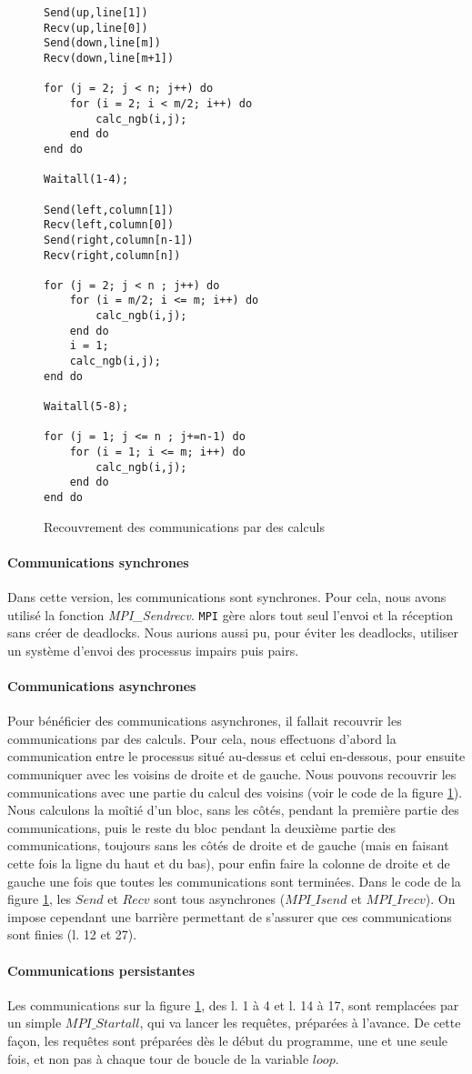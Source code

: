 \begin{figure}[h!]
\begin{lstlisting}
Send(up,line[1])
Recv(up,line[0])
Send(down,line[m])
Recv(down,line[m+1])

for (j = 2; j < n; j++) do
	for (i = 2; i < m/2; i++) do
		calc_ngb(i,j);
	end do
end do

Waitall(1-4);

Send(left,column[1])
Recv(left,column[0])
Send(right,column[n-1])
Recv(right,column[n])

for (j = 2; j < n ; j++) do
	for (i = m/2; i <= m; i++) do
		calc_ngb(i,j);
	end do
	i = 1;
	calc_ngb(i,j);
end do

Waitall(5-8);

for (j = 1; j <= n ; j+=n-1) do
	for (i = 1; i <= m; i++) do
		calc_ngb(i,j);
	end do
end do

\end{lstlisting}
\caption{Recouvrement des communications par des calculs}
\label{recouvrement}
\end{figure}
\paragraph{Communications synchrones}
Dans cette version, les communications sont synchrones. Pour cela, nous avons utilisé la fonction \emph{MPI\_Sendrecv}. \texttt{MPI} gère alors tout seul l'envoi et la réception sans créer de deadlocks. Nous aurions aussi pu, pour éviter les deadlocks, utiliser un système d'envoi des processus impairs puis pairs. 
\paragraph{Communications asynchrones}
Pour bénéficier des communications asynchrones, il fallait recouvrir les communications par des calculs. Pour cela, nous effectuons d'abord la communication entre le processus situé au-dessus et celui en-dessous, pour ensuite communiquer avec les voisins de droite et de gauche. Nous pouvons recouvrir les communications avec une partie du calcul des voisins (voir le code de la figure \ref{recouvrement}). Nous calculons la moîtié d'un bloc, sans les côtés, pendant la première partie des communications, puis le reste du bloc pendant la deuxième partie des communications, toujours sans les côtés de droite et de gauche (mais en faisant cette fois la ligne du haut et du bas), pour enfin faire la colonne de droite et de gauche une fois que toutes les communications sont terminées. Dans le code de la figure \ref{recouvrement}, les $Send$ et $Recv$ sont tous asynchrones ($MPI\_Isend$ et $MPI\_Irecv$). On impose cependant une barrière permettant de s'assurer que ces communications sont finies (l. 12 et 27).


\paragraph{Communications persistantes}
Les communications sur la figure \ref{recouvrement}, des l. 1 à 4 et l. 14 à 17, sont remplacées par un simple $MPI\_Startall$, qui va lancer les requêtes, préparées à l'avance. De cette façon, les requêtes sont préparées dès le début du programme, une et une seule fois, et non pas à chaque tour de boucle de la variable $loop$. 